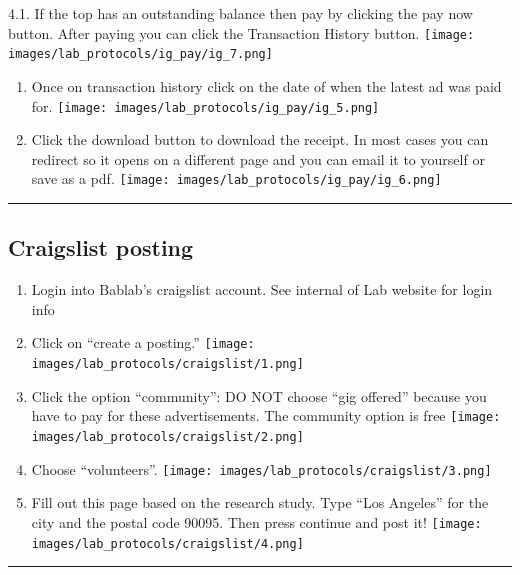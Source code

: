 \documentclass[
]{book}
\begin{document}
4.1. If the top has an outstanding balance then pay by clicking the pay now button. After paying you can click the Transaction History button.
\texttt{[image: images/lab\_protocols/ig\_pay/ig\_7.png]}

\begin{enumerate}
\def\labelenumi{\arabic{enumi}.}
\setcounter{enumi}{4}
\item
  Once on transaction history click on the date of when the latest ad was paid for.
  \texttt{[image: images/lab\_protocols/ig\_pay/ig\_5.png]}
\item
  Click the download button to download the receipt. In most cases you can redirect so it opens on a different page and you can email it to yourself or save as a pdf.
  \texttt{[image: images/lab\_protocols/ig\_pay/ig\_6.png]}
\end{enumerate}

\begin{center}\rule{0.5\linewidth}{0.5pt}\end{center}

\hypertarget{craigslist-posting}{%
\subsection{Craigslist posting}\label{craigslist-posting}}

\begin{enumerate}
\def\labelenumi{\arabic{enumi}.}
\item
  Login into Bablab's craigslist account. See internal of Lab website for login info
\item
  Click on ``create a posting.''
  \texttt{[image: images/lab\_protocols/craigslist/1.png]}
\item
  Click the option ``community'': DO NOT choose ``gig offered'' because you have to pay for these advertisements. The community option is free
  \texttt{[image: images/lab\_protocols/craigslist/2.png]}
\item
  Choose ``volunteers''.
  \texttt{[image: images/lab\_protocols/craigslist/3.png]}
\item
  Fill out this page based on the research study. Type ``Los Angeles'' for the city and the postal code 90095. Then press continue and post it!
  \texttt{[image: images/lab\_protocols/craigslist/4.png]}
\end{enumerate}

\begin{center}\rule{0.5\linewidth}{0.5pt}\end{center}
\end{document}
